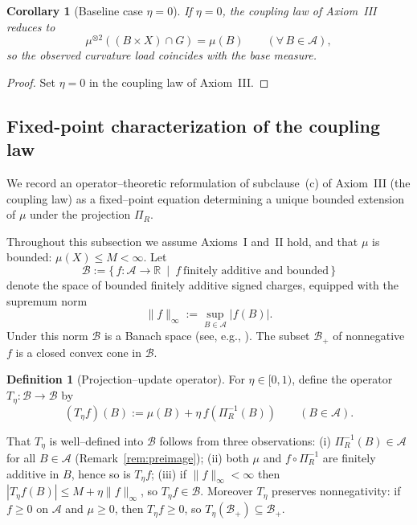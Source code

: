 \documentclass[11pt]{article}
\numberwithin{equation}{section}
\newtheorem{corollary}[theorem]{Corollary}
\theoremstyle{definition}
\newtheorem{definition}[theorem]{Definition}
\begin{document}
\begin{corollary}[Baseline case $\eta=0$]\label{cor:eta0-baseline}
If $\eta=0$, the coupling law of Axiom~III reduces to
\[
\mu^{\otimes2}((B\times X)\cap G)=\mu(B)\qquad(\forall\,B\in\mathcal A),
\]
so the observed curvature load coincides with the base measure.
\end{corollary}

\begin{proof}
Set $\eta=0$ in the coupling law of Axiom~III.
\end{proof}


\subsection{Fixed-point characterization of the coupling law}\label{sec:fixed-point-char}

We record an operator--theoretic reformulation of subclause~(c) of Axiom~III (the coupling law) as a fixed--point equation determining a unique bounded extension of $\mu$ under the projection $\Pi_R$.

Throughout this subsection we assume Axioms~I and~II hold, and that $\mu$ is bounded: $\mu(X)\le M<\infty$. Let
\[
\mathcal B:=\{\,f:\mathcal A\to\mathbb{R}\ \mid\ f\ \text{finitely additive and bounded}\,\}
\]
denote the space of bounded finitely additive signed charges, equipped with the supremum norm
\[
\|f\|_\infty:=\sup_{B\in\mathcal A}|f(B)|.
\]
Under this norm $\mathcal B$ is a Banach space (see, e.g., \cite{Rao,AliprantisBorder}). The subset $\mathcal B_+$ of nonnegative $f$ is a closed convex cone in $\mathcal B$.

\begin{definition}[Projection--update operator]\label{def:T-eta}
For $\eta\in[0,1)$, define the operator $T_\eta:\mathcal B\to\mathcal B$ by
\[
(T_\eta f)(B):=\mu(B)+\eta\,f(\Pi_R^{-1}(B))\qquad(B\in\mathcal A).
\]
\end{definition}

That $T_\eta$ is well--defined into $\mathcal B$ follows from three observations: (i) $\Pi_R^{-1}(B)\in\mathcal A$ for all $B\in\mathcal A$ (Remark~\ref{rem:preimage}); (ii) both $\mu$ and $f\circ\Pi_R^{-1}$ are finitely additive in $B$, hence so is $T_\eta f$; (iii) if $\|f\|_\infty<\infty$ then $|T_\eta f(B)|\le M+\eta\|f\|_\infty$, so $T_\eta f\in\mathcal B$. Moreover $T_\eta$ preserves nonnegativity: if $f\ge 0$ on $\mathcal A$ and $\mu\ge 0$, then $T_\eta f\ge 0$, so $T_\eta(\mathcal B_+)\subseteq\mathcal B_+$.
\end{document}
